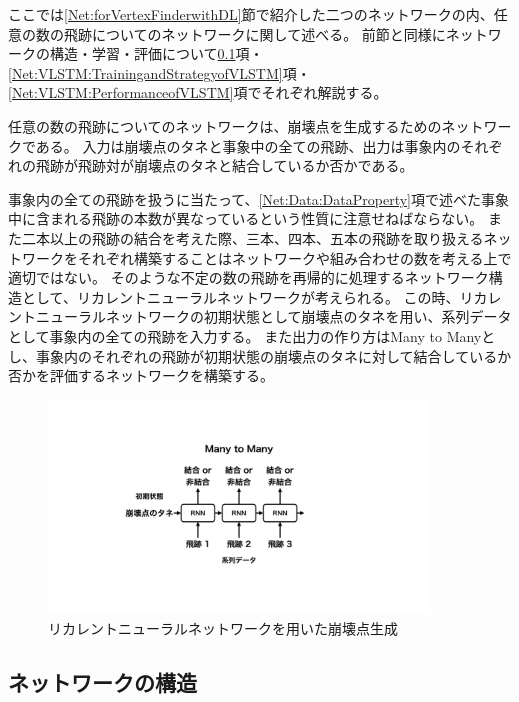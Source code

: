 ここでは\ref{Net:forVertexFinderwithDL}節で紹介した二つのネットワークの内、任意の数の飛跡についてのネットワークに関して述べる。
前節と同様にネットワークの構造・学習・評価について\ref{Net:VLSTM:StructureofVLSTM}項・\ref{Net:VLSTM:TrainingandStrategyofVLSTM}項・\ref{Net:VLSTM:PerformanceofVLSTM}項でそれぞれ解説する。

任意の数の飛跡についてのネットワークは、崩壊点を生成するためのネットワークである。
入力は崩壊点のタネと事象中の全ての飛跡、出力は事象内のそれぞれの飛跡が飛跡対が崩壊点のタネと結合しているか否かである。

事象内の全ての飛跡を扱うに当たって、\ref{Net:Data:DataProperty}項で述べた事象中に含まれる飛跡の本数が異なっているという性質に注意せねばならない。
また二本以上の飛跡の結合を考えた際、三本、四本、五本の飛跡を取り扱えるネットワークをそれぞれ構築することはネットワークや組み合わせの数を考える上で適切ではない。
そのような不定の数の飛跡を再帰的に処理するネットワーク構造として、リカレントニューラルネットワークが考えられる。
この時、リカレントニューラルネットワークの初期状態として崩壊点のタネを用い、系列データとして事象内の全ての飛跡を入力する。
また出力の作り方はMany to Manyとし、事象内のそれぞれの飛跡が初期状態の崩壊点のタネに対して結合しているか否かを評価するネットワークを構築する。

\begin{figure}[htbp]
 \centering
 \includegraphics[trim = 200 150 200 150, width=0.9\textwidth, clip]{Figure/3Networks/3-4-0-1VertexProductionwithRNN.png}
 \caption{リカレントニューラルネットワークを用いた崩壊点生成}
 \label{3-4-0-1VertexProductionwithRNN}
\end{figure}


\subsection{ネットワークの構造} \label{Net:VLSTM:StructureofVLSTM}

